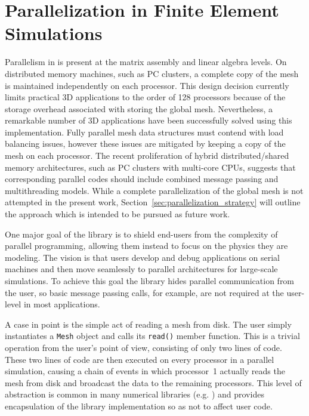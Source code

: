 \section{Parallelization in Finite Element Simulations\label{sec:parallel_issues}}
\enlargethispage{-\baselineskip}
Parallelism in \libMesh{} is present at the matrix assembly and linear
algebra levels.  On distributed memory machines, such as PC clusters,
a complete copy of the mesh is maintained independently on each
processor. This design decision currently limits practical 3D
applications to 
the order of 128 processors because of the storage overhead associated with
storing the global mesh.  Nevertheless, a remarkable number of 3D
applications have been successfully solved using this implementation.
Fully parallel mesh data structures must contend with load balancing issues, however these issues are mitigated by keeping a copy of the mesh on each processor. The recent proliferation of hybrid distributed/shared
memory architectures, such as PC clusters with multi-core CPUs, 
suggests that corresponding parallel codes should include
combined message passing and multithreading models.  While a complete
parallelization of the global mesh is not attempted in the present
work, Section~\ref{sec:parallelization_strategy} will outline the
approach which is intended to be pursued as future work.
 
One major goal of the library is to shield end-users from the
complexity of parallel programming, allowing them instead to focus on
the physics they are modeling.  The vision is that users develop and
debug applications on serial machines and then move seamlessly to
parallel architectures for large-scale simulations.  To achieve this
goal the library hides parallel communication from the user, so
basic message passing calls, for example, are not required at the user-level in most applications.

A case in point is the simple act of reading a mesh from disk.  The
user simply instantiates a \texttt{Mesh} object and calls its \texttt{read()}
member function.  This is a trivial operation from the user's point of
view, consisting of only two lines of code.  These two lines of code
are then executed on every processor in a parallel simulation, causing
a chain of events in which processor~1 actually reads the mesh from disk and broadcast the data
to the remaining processors.  This level of abstraction is common in
many numerical libraries (e.g. \PETSc{}) and provides encapsulation of
the library implementation so as not to affect user code.

